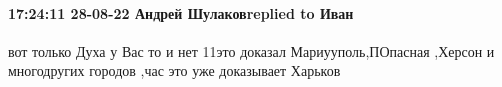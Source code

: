  
 
 
 
 


\paragraph{17:24:11 28-08-22 Андрей Шулаковreplied to Иван}

вот только Духа у Вас то и нет 11это доказал Мариууполь,ПОпасная ,Херсон и
многодругих городов ,час это уже доказывает Харьков






